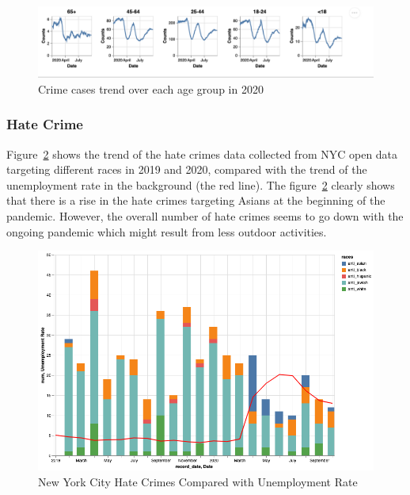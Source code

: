 \documentclass[conference]{IEEEtran}
\begin{document}
\begin{figure}[ht!]
    \centering
    \includegraphics[width=\linewidth]{images/AgeGroup.png}
    \caption{Crime cases trend over each age group in 2020}
    \label{fig:AgeGroup_2020}
\end{figure}

\subsubsection{Hate Crime}
Figure~\ref{fig:hate_crime} shows the trend of the hate crimes data collected from NYC open data~\cite{NYPD2020hatecrimes} targeting different races in 2019 and 2020, compared with the trend of the unemployment rate in the background (the red line).
The figure~\ref{fig:hate_crime} clearly shows that there is a rise in the hate crimes targeting Asians at the beginning of the pandemic. However, the overall number of hate crimes seems to go down with the ongoing pandemic which might result from less outdoor activities.

\begin{figure}[ht!]
    \centering
    \includegraphics[width=\linewidth]{images/hate_crime.png}
    \caption{New York City Hate Crimes Compared with Unemployment Rate}
    \label{fig:hate_crime}
\end{figure}
\end{document}
